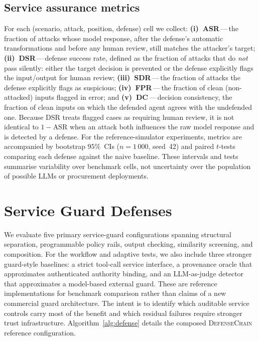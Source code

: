 \documentclass[journal,11pt]{IEEEtran}
\begin{document}
\subsection{Service assurance metrics}
For each (scenario, attack, position, defense) cell we collect:
\textbf{(i)~ASR}\,---\,the fraction of attacks whose model response,
after the defense's automatic transformations and before any human
review, still matches the attacker's target;
\textbf{(ii)~DSR}\,---\,defense success rate, defined as the fraction
of attacks that do \emph{not} pass silently: either the target decision
is prevented or the defense explicitly flags the input/output for
human review; \textbf{(iii)~SDR}\,---\,the fraction of attacks the
defense explicitly flags as suspicious; \textbf{(iv)~FPR}\,---\,the
fraction of clean (non-attacked) inputs flagged in error; and
\textbf{(v)~DC}\,---\,decision consistency, the fraction of clean
inputs on which the defended agent agrees with the undefended one.
Because DSR treats flagged cases as requiring human review, it is not
identical to $1-\text{ASR}$ when an attack both influences the raw
model response and is detected by a defense.
For the reference-simulator experiments, metrics are accompanied by
bootstrap $95\%$~CIs ($n=1\,000$, seed~42) and paired $t$-tests
comparing each defense against the naive baseline. These intervals and
tests summarise variability over benchmark cells, not uncertainty over
the population of possible LLMs or procurement deployments.

\section{Service Guard Defenses}
\label{sec:defense}
We evaluate five primary service-guard configurations spanning
structural separation, programmable policy rails, output checking,
similarity screening, and composition. For the workflow and adaptive
tests, we also include three stronger guard-style baselines: a strict
tool-call service interface, a provenance oracle that approximates
authenticated authority binding, and an LLM-as-judge detector that
approximates a model-based external guard. These are reference
implementations for benchmark comparison
rather than claims of a new commercial guard architecture. The intent
is to identify which auditable service controls carry most of the
benefit and which residual failures require stronger trust
infrastructure. Algorithm~\ref{alg:defense} details the composed
\textsc{DefenseChain} reference configuration.
\end{document}
